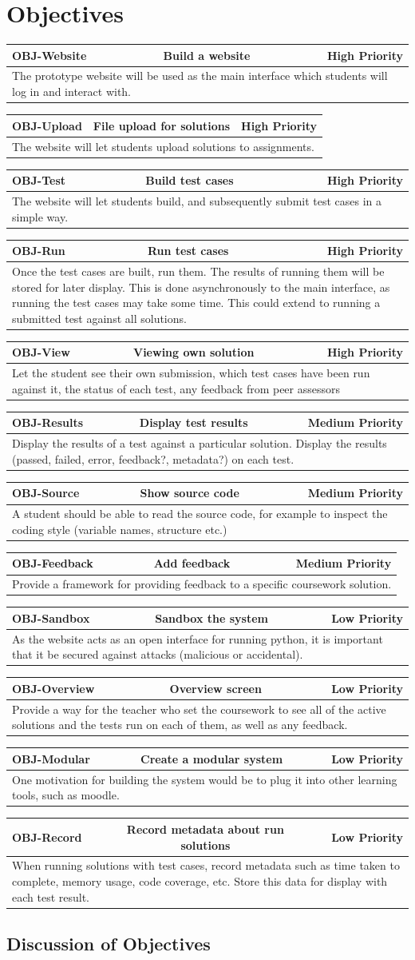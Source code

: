\documentclass[a4paper,11pt]{report}
\newcommand{\objitem}[4]{\begin{tabularx}{\textwidth}{|l|cr|} \hline \textbf{OBJ-#1} & #2 & #3 \\ \hline \multicolumn{3}{|X|}{#4} \\ \hline \end{tabularx}}
\begin{document}
\section{Objectives}
\objitem{Website}{Build a website}{High Priority}{The prototype website will be used as the main interface which students will log in and interact with.}
\objitem{Upload}{File upload for solutions}{High Priority}{The website will let students upload solutions to assignments.}
\objitem{Test}{Build test cases}{High Priority}{The website will let students build, and subsequently submit test cases in a simple way.}
\objitem{Run}{Run test cases}{High Priority}{Once the test cases are built, run them. The results of running them will be stored for later display. This is done asynchronously to the main interface, as running the test cases may take some time. This could extend to running a submitted test against all solutions.}
\objitem{View}{Viewing own solution}{High Priority}{Let the student see their own submission, which test cases have been run against it, the status of each test, any feedback from peer assessors}
\objitem{Results}{Display test results}{Medium Priority}{Display the results of a test against a particular solution. Display the results (passed, failed, error, feedback?, metadata?) on each test.}
\objitem{Source}{Show source code}{Medium Priority}{A student should be able to read the source code, for example to inspect the coding style (variable names, structure etc.)}
\objitem{Feedback}{Add feedback}{Medium Priority}{Provide a framework for providing feedback to a specific coursework solution.}
\objitem{Sandbox}{Sandbox the system}{Low Priority}{As the website acts as an open interface for running python, it is important that it be secured against attacks (malicious or accidental).}
\objitem{Overview}{Overview screen}{Low Priority}{Provide a way for the teacher who set the coursework to see all of the active solutions and the tests run on each of them, as well as any feedback.}
\objitem{Modular}{Create a modular system}{Low Priority}{One motivation for building the system would be to plug it into other learning tools, such as moodle.}
\objitem{Record}{Record metadata about run solutions}{Low Priority}{When running solutions with test cases, record metadata such as time taken to complete, memory usage, code coverage, etc. Store this data for display with each test result.}

\subsection{Discussion of Objectives}
\end{document}
